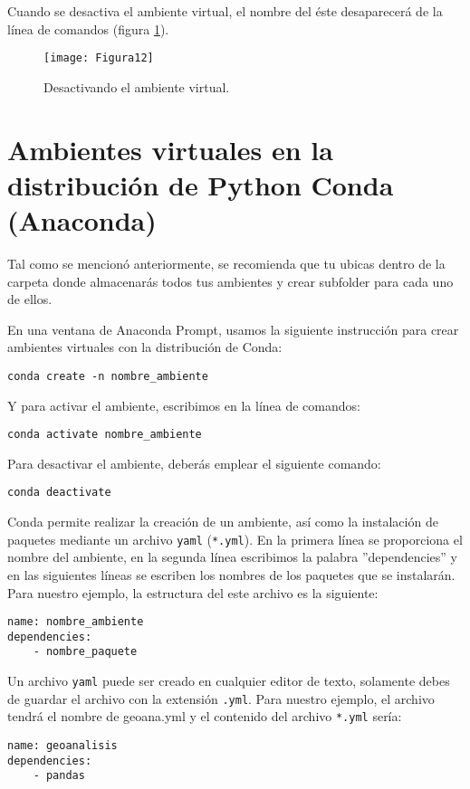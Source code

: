 Cuando se desactiva el ambiente virtual, el nombre del éste desaparecerá de la línea de comandos (figura \ref{fig:figura12}).
	
\begin{figure}[H]
\centering
\texttt{[image: Figura12]}
\caption{Desactivando el ambiente virtual.}
\label{fig:figura12}
\end{figure}
	
\section{Ambientes virtuales en la distribución de Python Conda (Anaconda)}
Tal como se mencionó anteriormente, se recomienda que tu ubicas dentro de la carpeta donde almacenarás todos tus ambientes y crear subfolder para cada uno de ellos.\bigskip
	
En una ventana de Anaconda Prompt, usamos la siguiente instrucción para crear ambientes virtuales con la distribución de Conda:
\begin{verbatim}
conda create -n nombre_ambiente
\end{verbatim}
	
Y para activar el ambiente, escribimos en la línea de comandos:
\begin{verbatim}
conda activate nombre_ambiente
\end{verbatim}
	
Para desactivar el ambiente, deberás emplear el siguiente comando:
\begin{verbatim}
conda deactivate 
\end{verbatim}
	
Conda permite realizar la creación de un ambiente, así como la instalación de paquetes mediante un archivo \texttt{yaml} (\texttt{*.yml}). En la primera línea se proporciona el nombre del ambiente, en la segunda línea escribimos la palabra ''dependencies'' y en las siguientes líneas se escriben los nombres de los paquetes que se instalarán. Para nuestro ejemplo, la estructura del este archivo es la siguiente:
\begin{verbatim}
name: nombre_ambiente
dependencies:
    - nombre_paquete 
\end{verbatim}
	
Un archivo \texttt{yaml} puede ser creado en cualquier editor de texto, solamente debes de guardar el archivo con la extensión \texttt{.yml}. Para nuestro ejemplo, el archivo tendrá el nombre de geoana.yml y el contenido del archivo \texttt{*.yml} sería:
\begin{verbatim}
name: geoanalisis
dependencies:
    - pandas 
\end{verbatim}
	

